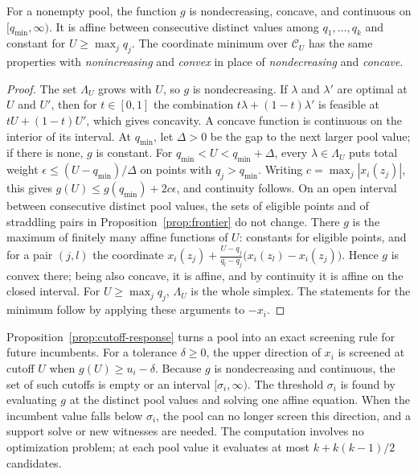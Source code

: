 \begin{proposition}\label{prop:cutoff-response}
For a nonempty pool, the function $g$ is nondecreasing, concave, and
continuous on $[q_{\min},\infty)$. It is affine between consecutive
distinct values among $q_1,\ldots,q_k$ and constant for
$U\ge\max_jq_j$. The coordinate minimum over $\mathcal C_U$ has the same
properties with \emph{nonincreasing} and \emph{convex} in place of
\emph{nondecreasing} and \emph{concave}.
\end{proposition}
\begin{proof}
The set $\Lambda_U$ grows with $U$, so $g$ is nondecreasing. If $\lambda$
and $\lambda'$ are optimal at $U$ and $U'$, then for $t\in[0,1]$ the
combination $t\lambda+(1-t)\lambda'$ is feasible at $tU+(1-t)U'$, which
gives concavity. A concave function is continuous on the interior of its
interval. At $q_{\min}$, let $\Delta>0$ be the gap to the next larger
pool value; if there is none, $g$ is constant. For
$q_{\min}<U<q_{\min}+\Delta$, every $\lambda\in\Lambda_U$ puts total
weight $\epsilon\le(U-q_{\min})/\Delta$ on points with $q_j>q_{\min}$.
Writing $c=\max_j|x_i(z_j)|$, this gives $g(U)\le g(q_{\min})+2c\epsilon$,
and continuity follows. On an open interval between consecutive distinct
pool values, the sets of eligible points and of straddling pairs in
Proposition~\ref{prop:frontier} do not change. There $g$ is the maximum of
finitely many affine functions of $U$: constants for eligible points, and
for a pair $(j,l)$ the coordinate
$x_i(z_j)+\frac{U-q_j}{q_l-q_j}\bigl(x_i(z_l)-x_i(z_j)\bigr)$. Hence $g$
is convex there; being also concave, it is affine, and by continuity it
is affine on the closed interval. For $U\ge\max_jq_j$, $\Lambda_U$ is the
whole simplex. The statements for the minimum follow by applying these
arguments to $-x_i$.
\end{proof}

Proposition~\ref{prop:cutoff-response} turns a pool into an exact
screening rule for future incumbents. For a tolerance $\delta\ge0$, the
upper direction of $x_i$ is screened at cutoff $U$ when
$g(U)\ge u_i-\delta$. Because $g$ is nondecreasing and continuous, the
set of such cutoffs is empty or an interval $[\sigma_i,\infty)$. The
threshold $\sigma_i$ is found by evaluating $g$ at the distinct pool
values and solving one affine equation. When the incumbent value falls
below $\sigma_i$, the pool can no longer screen this direction, and a
support solve or new witnesses are needed. The computation involves no
optimization problem; at each pool value it evaluates at most
$k+k(k-1)/2$ candidates.

